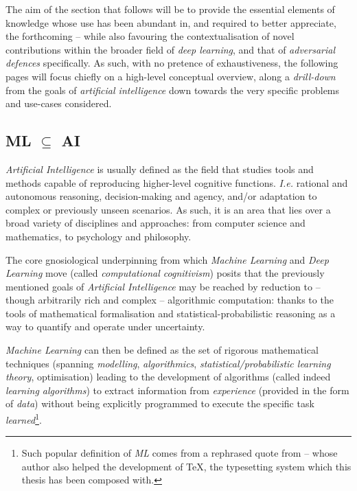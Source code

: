 

The aim of the section that follows will be to provide the essential elements of knowledge whose use has been abundant in, and required to better appreciate, the forthcoming -- while also favouring the contextualisation of novel contributions within the broader field of \textit{deep learning}, and that of \textit{adversarial defences} specifically. As such, with no pretence of exhaustiveness, the following pages will focus chiefly on a high-level conceptual overview, along a \textit{drill-down} from the goals of \textit{artificial intelligence} down towards the very specific problems and use-cases considered.


\subsection{ML $\subseteq$ AI}

\textit{Artificial Intelligence} is usually defined as the field that studies tools and methods capable of reproducing higher-level cognitive functions. \textit{I.e.} rational and autonomous reasoning, decision-making and agency, and/or adaptation to complex or previously unseen scenarios. As such, it is an area that lies over a broad variety of disciplines and approaches: from computer science and mathematics, to psychology and philosophy.

The core gnosiological underpinning from which \textit{Machine Learning} and \textit{Deep Learning} move (called \textit{computational cognitivism}) posits that the previously mentioned goals of \textit{Artificial Intelligence} may be reached by reduction to -- though arbitrarily rich and complex -- algorithmic computation: thanks to the tools of mathematical formalisation and statistical-probabilistic reasoning as a way to quantify and operate under uncertainty.

\textit{Machine Learning} can then be defined as the set of rigorous mathematical techniques (spanning \textit{modelling}, \textit{algorithmics}, \textit{statistical/probabilistic learning theory}, optimisation) leading to the development of algorithms (called indeed \textit{learning algorithms}) to extract information from \textit{experience} (provided in the form of \textit{data}) without being explicitly programmed to execute the specific task \textit{learned}\footnote{Such popular definition of \textit{ML} comes from a rephrased quote from \cite{Samuel1959MachineLearning} -- whose author also helped the development of \TeX, the typesetting system which this thesis has been composed with.}.

